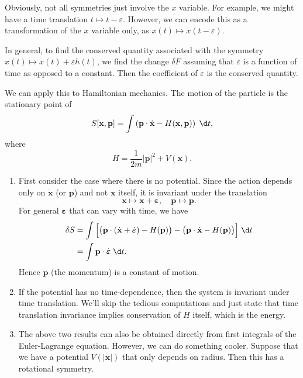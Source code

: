 \documentclass[a4paper]{article}
\begin{document}
Obviously, not all symmetries just involve the $x$ variable. For example, we might have a time translation $t \mapsto t - \varepsilon$. However, we can encode this as a transformation of the $x$ variable only, as $x(t) \mapsto x(t - \varepsilon)$.

In general, to find the conserved quantity associated with the symmetry $x(t)\mapsto x(t) + \varepsilon h(t)$, we find the change $\delta F$ assuming that $\varepsilon$ is a function of time as opposed to a constant. Then the coefficient of $\dot{\varepsilon}$ is the conserved quantity.

\begin{eg}
  We can apply this to Hamiltonian mechanics. The motion of the particle is the stationary point of
  \[
    S[\mathbf{x}, \mathbf{p}] = \int \left(\mathbf{p}\cdot \dot{\mathbf{x}} - H(\mathbf{x}, \mathbf{p})\right)\;\d t,
  \]
  where
  \[
    H = \frac{1}{2m} |\mathbf{p}|^2 + V(\mathbf{x}).
  \]
  \begin{enumerate}
    \item First consider the case where there is no potential. Since the action depends only on $\dot{\mathbf{x}}$ (or $\mathbf{p}$) and not $\mathbf{x}$ itself, it is invariant under the translation
      \[
        \mathbf{x}\mapsto \mathbf{x} + \boldsymbol\varepsilon,\quad \mathbf{p}\mapsto \mathbf{p}.
      \]
      For general $\boldsymbol\varepsilon$ that can vary with time, we have
      \begin{align*}
        \delta S &= \int \Big[\big(\mathbf{p}\cdot (\dot{\mathbf{x}} + \dot{\boldsymbol\varepsilon}) - H(\mathbf{p})\big) - \big(\mathbf{p}\cdot \dot{\mathbf{x}} - H(\mathbf{p})\big)\Big]\;\d t\\
        &= \int \mathbf{p}\cdot \dot{\boldsymbol\varepsilon}\;\d t.
      \end{align*}
      Hence $\mathbf{p}$ (the momentum) is a constant of motion.
    \item If the potential has no time-dependence, then the system is invariant under time translation. We'll skip the tedious computations and just state that time translation invariance implies conservation of $H$ itself, which is the energy.

    \item The above two results can also be obtained directly from first integrals of the Euler-Lagrange equation. However, we can do something cooler. Suppose that we have a potential $V(|\mathbf{x}|)$ that only depends on radius. Then this has a rotational symmetry.


\end{enumerate}
\end{eg}
\end{document}
